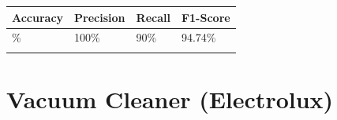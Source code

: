 
{\def\LTcaptype{none} %
\begin{longtable}[]{@{}llll@{}}
\toprule\noalign{}
\textbf{Accuracy} & \textbf{Precision} & \textbf{Recall} &
\textbf{F1-Score} \\
\midrule\noalign{}
\endhead
95\% & 100\% & 90\% & 94.74\% \\
\bottomrule\noalign{}
\end{longtable}
}

\section{Vacuum Cleaner (Electrolux)}\label{appendix-e.6.-arc-fault-test-result-for-vacuum-cleaner-electrolux}


